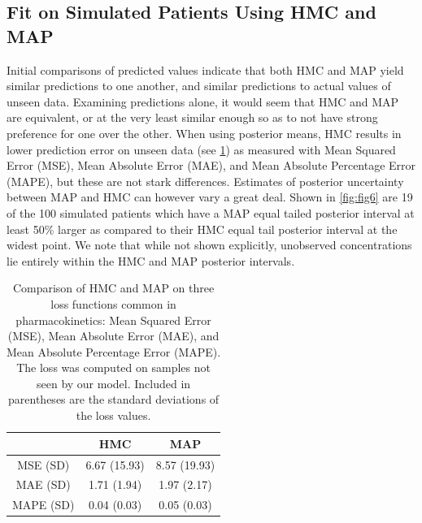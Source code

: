 


\subsection*{Fit on Simulated Patients Using HMC and MAP}

Initial comparisons of predicted values indicate that both HMC and MAP yield similar predictions to one another, and similar predictions to actual values of unseen data.  Examining predictions alone, it would seem that HMC and MAP are equivalent, or at the very least similar enough so as to not have strong preference for one over the other. When using posterior means, HMC results in lower prediction error on unseen data (see \cref{table2}) as measured with Mean Squared Error (MSE), Mean Absolute Error (MAE), and Mean Absolute Percentage Error (MAPE), but these are not stark differences. Estimates of posterior uncertainty between MAP and HMC can however vary a great deal. Shown in \cref{fig:fig6} are 19 of the 100 simulated patients which have a MAP equal tailed posterior interval at least 50\% larger as compared to their HMC equal tail posterior interval at the widest point. We note that while not shown explicitly, unobserved concentrations lie entirely within the HMC and MAP posterior intervals.



\begin{table}
	\centering
\begin{tabular}{|c|c|c|}
	\hline 
	& HMC & MAP \\ 
	\hline 
	MSE (SD) & 6.67 (15.93) & 8.57 (19.93) \\ 
	\hline 
	MAE (SD) & 1.71 (1.94) & 1.97 (2.17) \\ 
	\hline 
	MAPE (SD) & 0.04 (0.03) & 0.05 (0.03)\\ 
	\hline 
\end{tabular} 
\caption{Comparison of HMC and MAP on three loss functions common in pharmacokinetics:  Mean Squared Error (MSE), Mean Absolute Error (MAE), and Mean Absolute Percentage Error (MAPE).  The loss was computed on samples not seen by our model.  Included in parentheses are the standard deviations of the loss values.}
\label{table2}
\end{table}

